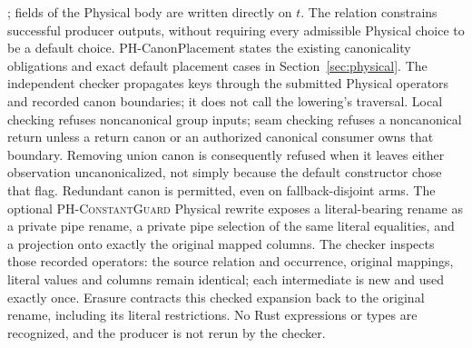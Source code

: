 ; fields of the Physical body are
written directly on $t$. The relation constrains successful producer outputs,
without requiring every admissible Physical choice to be a default choice.
PH-CanonPlacement states the existing canonicality obligations and exact default
placement cases in Section~\ref{sec:physical}. The independent checker propagates
keys through the submitted Physical operators and recorded canon boundaries;
it does not call the lowering's  traversal. Local checking
refuses noncanonical group inputs; seam checking refuses a noncanonical return
unless a return canon or an authorized canonical consumer owns that boundary.
Removing union canon is consequently refused when it leaves either observation
uncanonicalized, not simply because the default constructor chose that flag.
Redundant canon is permitted, even on fallback-disjoint arms.
The optional \textsc{PH-ConstantGuard} Physical rewrite exposes a literal-bearing
rename as a private pipe rename, a private pipe selection of the same literal
equalities, and a projection onto exactly the original mapped columns.
The checker inspects those recorded operators: the source relation and occurrence,
original mappings, literal values and columns remain identical; each intermediate
is new and used exactly once. Erasure contracts this checked expansion back to
the original rename, including its literal restrictions. No Rust expressions or
types are recognized, and the producer is not rerun by the checker.


